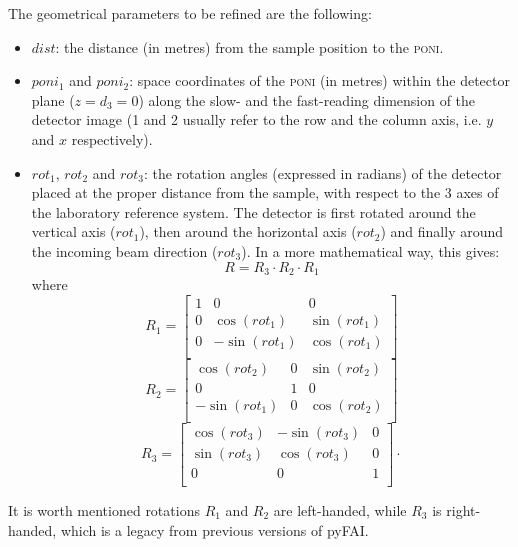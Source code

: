 \documentclass[preprint]{iucr}              %
\begin{document}
The geometrical parameters to be refined are the following:
\begin{itemize}
  \item $dist$: the distance (in metres) from the sample position to the
  \textsc{poni}.
  \item $poni_1$ and $poni_2$: space coordinates of the
  \textsc{poni} (in metres) within the detector plane ($z=d_3=0$) along the slow-
  and the fast-reading dimension of the detector image (1 and 2 usually refer to the row
  and the column axis, i.e. $y$ and $x$ respectively).
  \item $rot_1$, $rot_2$ and $rot_3$: the
  rotation angles (expressed in radians) of the detector placed at the proper
  distance from the sample, with respect to the 3 axes of the
  laboratory reference system.
  The detector is first rotated around the vertical axis ($rot_1$), then
  around the horizontal axis ($rot_2$) and finally around the
  incoming beam direction ($rot_3$). In a more mathematical way, this gives:
\begin{equation}
	R = R_3 \cdot R_2 \cdot R_1 
\end{equation}
where
\begin{equation}
	R_1 = 	
	\begin{bmatrix}
	1 & 0 & 0\\
	0 & \cos(rot_1) & \sin(rot_1) \\
	0 & -\sin(rot_1) & \cos(rot_1) \\
	\end{bmatrix}
\end{equation}
\begin{equation} 		
	R_2 =
	\begin{bmatrix}
	\cos(rot_2) & 0 & \sin(rot_2) \\
	0 & 1 & 0 \\
	-\sin(rot_1)&0 & \cos(rot_2) \\
	\end{bmatrix}
\end{equation}
\begin{equation} 	
	R_3 =
	\begin{bmatrix}
	\cos(rot_3) & -\sin(rot_3) & 0 \\
	\sin(rot_3) & \cos(rot_3) & 0\\
	0 & 0 & 1\\
	\end{bmatrix}
	\cdot 
\end{equation}

\end{itemize}
It is worth mentioned rotations $R_1$ and $R_2$ are left-handed, while 
$R_3$ is right-handed, which is a legacy from previous versions of pyFAI.
\end{document}
